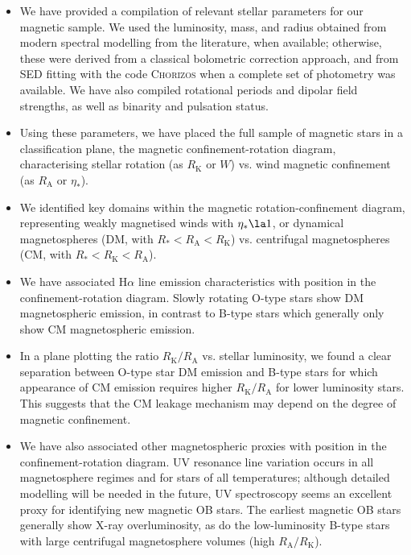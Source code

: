 \documentclass[useAMS,usenatbib]{mn2e}
\newcommand{\etas}{\eta_\ast}
\newcommand{\ra}{R_\mathrm{A}}
\newcommand{\rk}{R_\mathrm{K}}
\newcommand{\rs}{R_\ast}
\begin{document}
\begin{itemize}


\item We have provided a compilation of relevant stellar parameters for our magnetic sample. We used the luminosity, mass, and radius obtained from modern spectral modelling from the literature, when available; otherwise, these were derived from a classical bolometric correction approach, and from SED fitting with the code \textsc{Chorizos} when a complete set of photometry was available. We have also compiled rotational periods and dipolar field strengths, as well as binarity and pulsation status. 

\item Using these parameters, we have placed the full sample of magnetic stars in a classification plane, the magnetic confinement-rotation diagram, characterising stellar rotation (as $\rk$ or $W$) vs. wind magnetic confinement (as $\ra$ or $\etas$).


\item We identified key domains within the magnetic rotation-confinement diagram,  representing weakly magnetised winds with $\etas \la 1$, or  dynamical magnetospheres (DM, with $\rs < \ra < \rk$) vs. centrifugal magnetospheres (CM, with $\rs < \rk < \ra$).

\item We have associated H$\alpha$ line emission characteristics with position in the confinement-rotation diagram. Slowly rotating O-type stars show DM magnetospheric emission, in contrast to B-type stars which generally only show CM magnetospheric emission.

\item In a plane plotting the ratio $\rk/\ra$ vs. stellar luminosity, we found a clear separation between O-type star DM emission and B-type stars for which appearance of CM emission requires higher $\rk/\ra$ for lower luminosity stars. This suggests that the CM leakage mechanism may depend on the degree of magnetic confinement.


\item We have also associated other magnetospheric proxies with position in the confinement-rotation diagram. UV resonance line variation occurs in all magnetosphere regimes and for stars of all temperatures; although detailed modelling will be needed in the future, UV spectroscopy seems an excellent proxy for identifying new magnetic OB stars. 
The earliest magnetic OB stars generally show X-ray overluminosity, as do the low-luminosity B-type stars with large centrifugal magnetosphere volumes (high $\ra/\rk$).  


\end{itemize}
\end{document}
